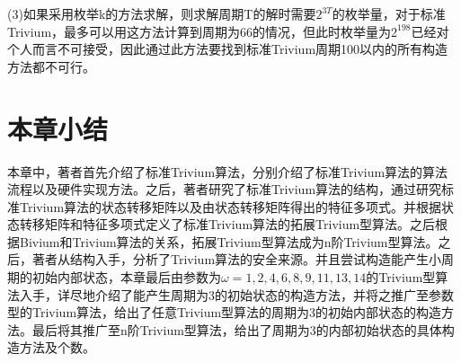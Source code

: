 (3)如果采用枚举k的方法求解，则求解周期T的解时需要$2^{3T}$的枚举量，对于标准Trivium，最多可以用这方法计算到周期为66的情况，但此时枚举量为$2^{198}$已经对个人而言不可接受，因此通过此方法要找到标准Trivium周期100以内的所有构造方法都不可行。

\section{本章小结}

本章中，著者首先介绍了标准Trivium算法，分别介绍了标准Trivium算法的算法流程以及硬件实现方法。之后，著者研究了标准Trivium算法的结构，通过研究标准Trivium算法的状态转移矩阵以及由状态转移矩阵得出的特征多项式。并根据状态转移矩阵和特征多项式定义了标准Trivium算法的拓展Trivium型算法。之后根据Bivium和Trivium算法的关系，拓展Trivium型算法成为n阶Trivium型算法。之后，著者从结构入手，分析了Trivium算法的安全来源。并且尝试构造能产生小周期的初始内部状态，本章最后由参数为$\omega={1, 2, 4, 6, 8, 9, 11, 13, 14}$的Trivium型算法入手，详尽地介绍了能产生周期为3的初始状态的构造方法，并将之推广至参数型的Trivium算法，给出了任意Trivium型算法的周期为3的初始内部状态的构造方法。最后将其推广至n阶Trivium型算法，给出了周期为3的内部初始状态的具体构造方法及个数。